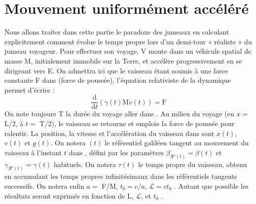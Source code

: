 \section{Mouvement uniformément accéléré}%
Nous allons traiter dans cette partie le paradoxe des jumeaux en calculant explicitement
comment évolue le temps propre lors d’un demi-tour « réaliste » du jumeau voyageur.
Pour effectuer son voyage, V monte dans un véhicule spatial de masse M, initialement immobile
sur la Terre, et accélère progressivement en se dirigeant vers E. On admettra ici que le vaisseau
étant soumis à une force constante F dans  (force de poussée), l’équation relativiste de la
dynamique permet d’écrire :
\[
\frac{\text{d}}{\text{d}t}(\gamma(t)\text{M}v(t)) = \text{F}
\]
On note toujours T la durée du voyage aller dans . Au milieu du voyage (en $x =$ L/2, à $t =$ T/2),
le vaisseau se retourne et emploie la force de poussée pour ralentir. La position, la vitesse et
l’accélération du vaisseau dans  sont $x(t)$, $v(t)$ et $g(t)$. On notera $(t)$ le référentiel galiléen
tangent au mouvement du vaisseau à l’instant $t$ dans , défini par les paramètres $\beta_{\mathcal{R'}(t)} = \beta(t)$
et $\gamma_{\mathcal{R'}(t)} = \gamma(t)$ habituels. On notera $\tau(t)$ le temps propre du vaisseau, obtenu en accumulant les
temps propres infinitésimaux dans les référentiels tangents successifs. On notera enfin $a =$ F/M,
$t_0 = c/a$, $\mathcal{L} = ct_0$ . Autant que possible les résultats seront exprimés en fonction de L, $\mathcal{L}$, et $t_0$ .
